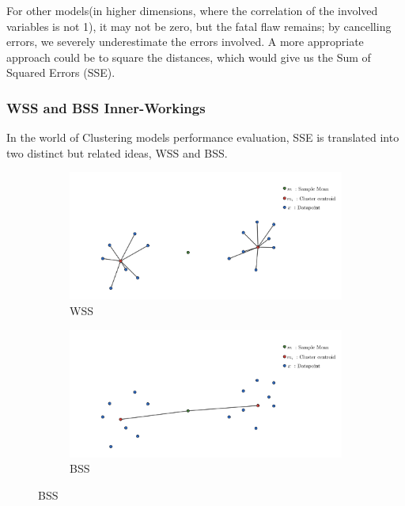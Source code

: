 \documentclass[11pt]{article}
\begin{document}
				\fi
				For other models(in higher dimensions, where the correlation of the involved variables is not 1), it may not be zero, but the fatal flaw remains; by cancelling errors, we severely underestimate the errors involved. A more appropriate approach could be to square the distances, which would give us the Sum of Squared Errors (SSE).\\

			\subsubsection*{WSS and BSS Inner-Workings}
				In the world of Clustering models performance evaluation, SSE is translated into two distinct but related ideas, WSS and BSS.
				\iffalse
				\begin{figure}[H]
					\centering
					\begin{subfigure}{0.4\textwidth}
						\includegraphics[width=\textwidth]{res/t1/t15/t15-WSS}
						\caption{WSS}
						\label{fig:first}
					\end{subfigure}
					\hfill
					\begin{subfigure}{0.4\textwidth}
						\includegraphics[width=\textwidth]{res/t1/t15/t15-BSS}
						\caption{BSS}
						\label{fig:second}
					\end{subfigure}
					\hfill
					\label{fig:figures}
				\end{figure}
\end{document}
